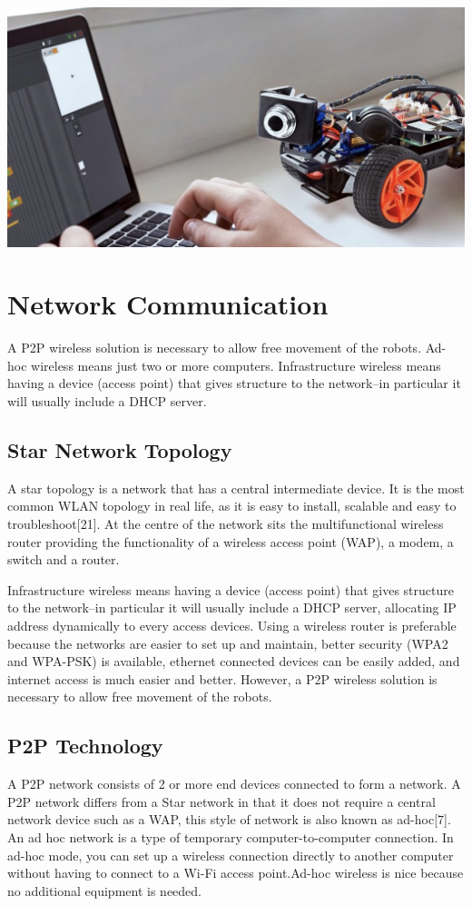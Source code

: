 \documentclass{mproj}
\begin{document}
\includegraphics[width = .7\textwidth]{a.jpg}



\section{Network Communication}
A P2P wireless solution is necessary to allow free movement of the robots.
Ad-hoc wireless means just two or more computers. Infrastructure wireless means having a device (access point) that gives structure to the network--in particular it will usually include a DHCP server.

\subsection{Star Network Topology}

A star topology is a network that has a central intermediate device. It is the most common WLAN topology in real life, as it is easy to install, scalable and easy to troubleshoot[21]. At the centre of the network sits the multifunctional wireless router providing the functionality of a wireless access point (WAP), a modem, a switch and a router.

Infrastructure wireless means having a device (access point) that gives structure to the network--in particular it will usually include a DHCP server, allocating IP address dynamically to every access devices. Using a wireless router is preferable because the networks are easier to set up and maintain, better security (WPA2 and WPA-PSK) is available, ethernet connected devices can be easily added, and internet access is much easier and better. However, a P2P wireless solution is necessary to allow free movement of the robots.

\subsection{P2P Technology}
A P2P network consists of 2 or more end devices connected to form a network. A P2P network differs from a Star network in that it does not require a central network device such as a WAP, this style of network is also known as ad-hoc[7]. 
An ad hoc network is a type of temporary computer-to-computer connection. In ad-hoc mode, you can set up a wireless connection directly to another computer without having to connect to a Wi-Fi access point.Ad-hoc wireless is nice because no additional equipment is needed. 
\end{document}
